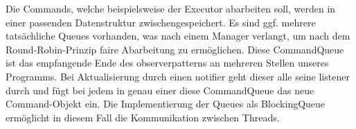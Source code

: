       \medskip
      Die Commands, welche beispielsweise der Executor abarbeiten soll, werden in
      einer passenden Datenstruktur zwischengespeichert. Es sind ggf. mehrere
      tatsächliche Queues vorhanden, was nach einem Manager verlangt, um nach dem
      Round-Robin-Prinzip faire Abarbeitung zu ermöglichen. Diese CommandQueue
      ist das empfangende Ende des \gls{observerpattern}s an mehreren Stellen unseres
      Programms. Bei Aktualisierung durch einen \gls{notifier} geht dieser alle
      seine \gls{listener} durch und fügt bei jedem in genau einer diese
      CommandQueue das neue Command-Objekt ein. Die Implementierung der Queues
      als BlockingQueue ermöglicht in diesem Fall die Kommunikation zwischen Threads.
